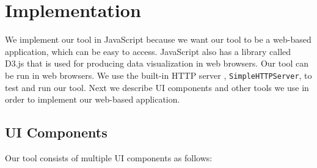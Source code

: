 \section{Implementation}
We implement our tool in JavaScript because we want our tool to be a web-based application, which can be easy to access. JavaScript also has a library called D3.js that is used for producing data visualization in web browsers. Our tool can be run in web browsers. We use the built-in HTTP server , \texttt{SimpleHTTPServer}, to test and run our tool. Next we describe UI components and other tools we use in order to implement our web-based application.
\subsection{UI Components}
Our tool consists of multiple UI components as follows:
